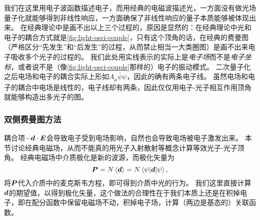 我们在这里用电子波函数描述电子，而用经典的电磁波描述光，一方面没有做光场量子化就能够得到非线性响应，一方面确保了非线性响应的量子本质能够被体现出来。
在经典理论中是画不出以上三个过程的，原因是显然的：在经典理论中光和电子的耦合方式就是\autoref{fig:light-osci-couple}，只有这个顶角的话，在经典的费曼图（严格区分“先发生”和“后发生”的过程，从而禁止相当一大类圈图）是画不出来电子吸收多个光子的过程的。
我们此处用实线表示的实际上是\emph{电子场}而不是\emph{电子坐标}，或者说不是（像\autoref{fig:light-osci-couple}那样的）电子的振动模式。
二次量子化之后电场和电子的耦合实际上形如$A_\mu \bar{\psi} \psi$，因此的确有两条电子线。
虽然电场和电子的耦合中电场是线性的，电子线却有两条，因此仅仅用电子-光子相互作用顶角就能够构造出多光子的图。

\subsubsection{双侧费曼图方法}\label{sec:pure-double-sided-feynman}

耦合项$- \vb*{d} \cdot \vb*{E}$会导致电子受到电场影响，自然也会导致电场被电子激发出来。
本节讨论经典电磁场，从而不能真的用光子入射散射等概念计算等效光子-光子顶角。
经典电磁场中介质极化是新的波源，而极化矢量为
\begin{equation}
    \vb*{P} = N \expval*{\vb*{d}} = N \mel*{\psi}{\vb*{d}}{\psi},
\end{equation}
将$\vb*{P}$代入介质中的麦克斯韦方程，即可得到介质中光的行为。
我们这里直接计算$\vb*{d}$的期望值，以得到极化矢量，这个做法的合理性在于我们本质上还是在积掉电子，即在配分函数中保留电磁场不动，积掉电子场，计算（两边是基态的）关联函数。

